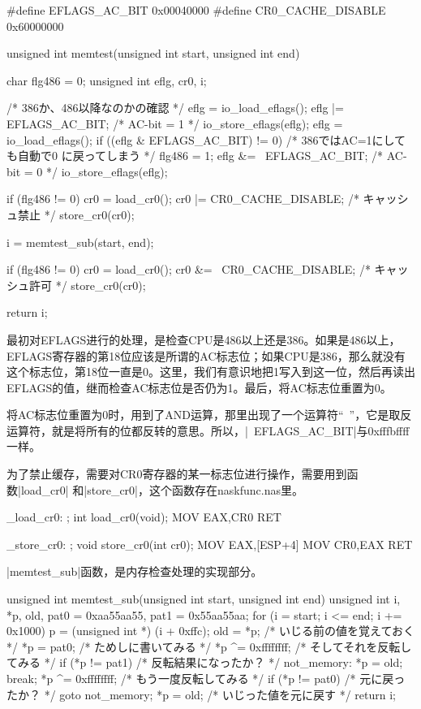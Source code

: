 \begin{code}[label=bootpack.c节选]
#define EFLAGS_AC_BIT		0x00040000
#define CR0_CACHE_DISABLE	0x60000000

unsigned int memtest(unsigned int start, unsigned int end)
{
	char flg486 = 0;
	unsigned int eflg, cr0, i;

	/* 386か、486以降なのかの確認 */
	eflg = io_load_eflags();
	eflg |= EFLAGS_AC_BIT; /* AC-bit = 1 */
	io_store_eflags(eflg);
	eflg = io_load_eflags();
	if ((eflg & EFLAGS_AC_BIT) != 0) { /* 386ではAC=1にしても自動で0 に戻ってしまう */
		flg486 = 1;
	}
	eflg &= ~EFLAGS_AC_BIT; /* AC-bit = 0 */
	io_store_eflags(eflg);

	if (flg486 != 0) {
		cr0 = load_cr0();
		cr0 |= CR0_CACHE_DISABLE; /* キャッシュ禁止 */
		store_cr0(cr0);
	}

	i = memtest_sub(start, end);

	if (flg486 != 0) {
		cr0 = load_cr0();
		cr0 &= ~CR0_CACHE_DISABLE; /* キャッシュ許可 */
		store_cr0(cr0);
	}

	return i;
}
\end{code}

最初对EFLAGS进行的处理，是检查CPU是486以上还是386。如果是486以上，EFLAGS寄存器的第18位应该是所谓的AC标志位；如果CPU是386，那么就没有这个标志位，第18位一直是0。这里，我们有意识地把1写入到这一位，然后再读出EFLAGS的值，继而检查AC标志位是否仍为1。最后，将AC标志位重置为0。

将AC标志位重置为0时，用到了AND运算，那里出现了一个运算符“~”，它是取反运算符，就是将所有的位都反转的意思。所以，|~EFLAGS_AC_BIT|与0xfffbffff 一样。

为了禁止缓存，需要对CR0寄存器的某一标志位进行操作，需要用到函数|load_cr0| 和|store_cr0|，这个函数存在naskfunc.nas里。

\begin{code}[label=naskfunc.nas节选]
_load_cr0:		; int load_cr0(void);
		MOV		EAX,CR0
		RET

_store_cr0:		; void store_cr0(int cr0);
		MOV		EAX,[ESP+4]
		MOV		CR0,EAX
		RET
\end{code}

\cs

|memtest_sub|函数，是内存检查处理的实现部分。

\begin{code}
unsigned int memtest_sub(unsigned int start, unsigned int end)
{
	unsigned int i, *p, old, pat0 = 0xaa55aa55, pat1 = 0x55aa55aa;
	for (i = start; i <= end; i += 0x1000) {
		p = (unsigned int *) (i + 0xffc);
		old = *p;			/* いじる前の値を覚えておく */
		*p = pat0;			/* ためしに書いてみる */
		*p ^= 0xffffffff;	/* そしてそれを反転してみる */
		if (*p != pat1) {	/* 反転結果になったか？ */
not_memory:
			*p = old;
			break;
		}
		*p ^= 0xffffffff;	/* もう一度反転してみる */
		if (*p != pat0) {	/* 元に戻ったか？ */
			goto not_memory;
		}
		*p = old;			/* いじった値を元に戻す */
	}
	return i;
}
\end{code}

